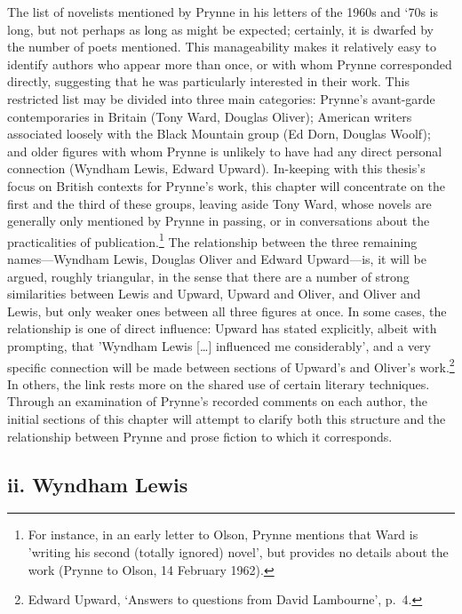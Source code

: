 \documentclass[]{article}
\begin{document}
The list of novelists mentioned by Prynne in his letters of the 1960s
and ‘70s is long, but not perhaps as long as might be expected;
certainly, it is dwarfed by the number of poets mentioned. This
manageability makes it relatively easy to identify authors who appear
more than once, or with whom Prynne corresponded directly, suggesting
that he was particularly interested in their work. This restricted list
may be divided into three main categories: Prynne’s avant-garde
contemporaries in Britain (Tony Ward, Douglas Oliver); American writers
associated loosely with the Black Mountain group (Ed Dorn, Douglas
Woolf); and older figures with whom Prynne is unlikely to have had any
direct personal connection (Wyndham Lewis, Edward Upward). In-keeping
with this thesis’s focus on British contexts for Prynne’s work, this
chapter will concentrate on the first and the third of these groups,
leaving aside Tony Ward, whose novels are generally only mentioned by
Prynne in passing, or in conversations about the practicalities of
publication.\footnote{For instance, in an early letter to Olson, Prynne
  mentions that Ward is ’writing his second (totally ignored) novel’,
  but provides no details about the work (Prynne to Olson, 14 February
  1962).} The relationship between the three remaining names—Wyndham
Lewis, Douglas Oliver and Edward Upward—is, it will be argued, roughly
triangular, in the sense that there are a number of strong similarities
between Lewis and Upward, Upward and Oliver, and Oliver and Lewis, but
only weaker ones between all three figures at once. In some cases, the
relationship is one of direct influence: Upward has stated explicitly,
albeit with prompting, that ’Wyndham Lewis {[}\ldots{}{]} influenced me
considerably’, and a very specific connection will be made between
sections of Upward’s and Oliver’s work.\footnote{Edward Upward, ‘Answers
  to questions from David Lambourne’, p.~4.} In others, the link rests
more on the shared use of certain literary techniques. Through an
examination of Prynne’s recorded comments on each author, the initial
sections of this chapter will attempt to clarify both this structure and
the relationship between Prynne and prose fiction to which it
corresponds.

\subsection{ii. Wyndham Lewis}\label{ii.-wyndham-lewis}
\end{document}
